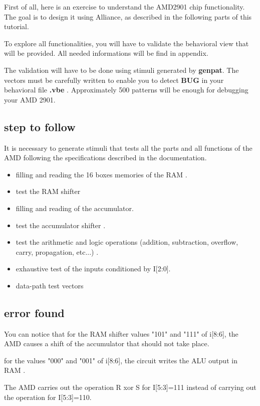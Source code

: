 \documentclass{article}
\begin{document}
{First of all, here is an exercise to understand the AMD2901
chip functionality. The goal is to design it 
using Alliance, as described in the following parts of
this tutorial.

To explore all functionalities, you will have
to validate the behavioral view that will be provided. 
All needed informations will be find in appendix.

The validation will have to be done using stimuli 
generated by {\bf genpat}. The vectors must be carefully written
to enable you to detect { \bf BUG } in your behavioral file { \bf .vbe }. 
Approximately 500 patterns will be enough for debugging your AMD 2901.

\subsection{step to follow}
It is necessary to generate stimuli that tests all the parts and all functions
of the AMD following the specifications described in the documentation.

\begin{itemize}\itemsep=-.8ex
\item   filling and reading the 16 boxes memories of the RAM .
\item   test the RAM shifter
\item   filling and reading of the accumulator.
\item   test the accumulator shifter .
\item   test the arithmetic and logic operations
        (addition, subtraction, overflow, carry, propagation, etc...) .
\item   exhaustive test of the inputs conditioned by I[2:0].
\item   data-path test vectors
\end{itemize}

\subsection{error found}

You can notice that for the RAM shifter values "101" and "111" of
i[8:6], the AMD causes a shift of the accumulator that should not
take place.

for the values "000" and "001" of i[8:6], the circuit writes the
ALU output in RAM .

The AMD carries out the operation R xor S for
I[5:3]=111 instead of carrying out the operation for I[5:3]=110.

}
\end{document}
